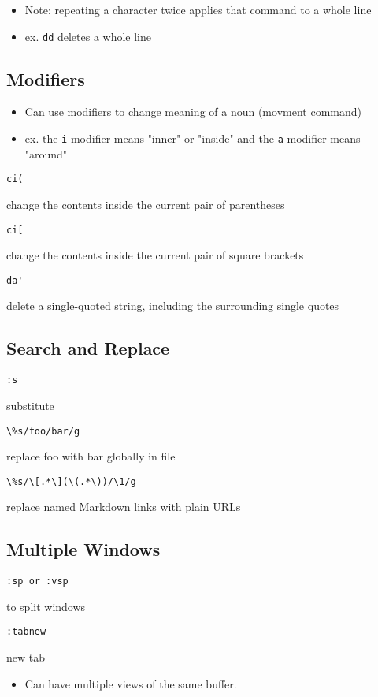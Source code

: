 \documentclass[letterpaper,12pt]{article}
\newcommand*{\lstitem}[1]{
  \setbox0\hbox{\lstinline{#1}}
  \item[\usebox0]
}
\begin{document}
\begin{itemize}
 \item Note: repeating a character twice applies that command to a whole line
 \item ex. \lstinline{dd} deletes a whole line
\end{itemize}

\subsection{Modifiers}
\begin{itemize}
 \item Can use modifiers to change meaning of a noun (movment command)
 \item ex. the \lstinline{i} modifier means "inner" or "inside" and the \lstinline{a} modifier means "around"
\end{itemize}

\begin{description}
 \lstitem{ci(} change the contents inside the current pair of parentheses
 \lstitem{ci[} change the contents inside the current pair of square brackets
 \lstitem{da'} delete a single-quoted string, including the surrounding single quotes
\end{description}

\subsection{Search and Replace}
\begin{description}
 \lstitem{:s} substitute
 \lstitem{\%s/foo/bar/g} replace foo with bar globally in file
 \lstitem{\%s/\[.*\](\(.*\))/\1/g} replace named Markdown links with plain URLs
\end{description}

\subsection{Multiple Windows}
\begin{description}
 \lstitem{:sp or :vsp} to split windows
 \lstitem{:tabnew} new tab
\end{description}

\begin{itemize}
 \item Can have multiple views of the same buffer.
\end{itemize}
\end{document}
